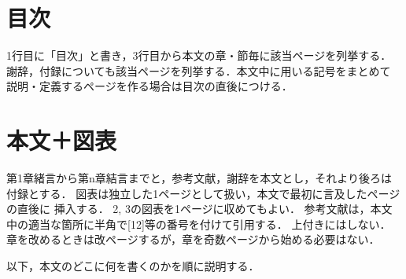\documentclass[main]{subfiles}
\begin{document}
\section{目次}
1行目に「目次」と書き，3行目から本文の章・節毎に該当ページを列挙する．
謝辞，付録についても該当ページを列挙する．本文中に用いる記号をまとめて
説明・定義するページを作る場合は目次の直後につける．

\section{本文＋図表}
第1章緒言から第n章結言までと，参考文献，謝辞を本文とし，それより後ろは
付録とする．
図表は独立した1ページとして扱い，本文で最初に言及したページの直後に
挿入する．
2, 3の図表を1ページに収めてもよい．
参考文献は，本文中の適当な箇所に半角で[12]等の番号を付けて引用する．
上付きにはしない．
章を改めるときは改ページするが，章を奇数ページから始める必要はない．

以下，本文のどこに何を書くのかを順に説明する．
\end{document}
